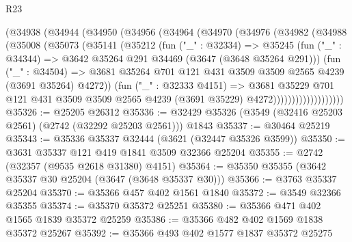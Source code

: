 \begin{lexlean}{R23}
\begin{coremodule}
              (@34938
                (@34944
                  (@34950
                    (@34956
                      (@34964
                        (@34970
                          (@34976
                            (@34982
                              (@34988
                                (@35008
                                  (@35073
                                    (@35141
                                      (@35212
                                        (fun ("_" : @32334) =>
                                        @35245
                                          (fun ("_" : @34344) =>
                                          @3642 @35264 @291 @34469 (@3647 (@3648 @35264 @291)))
                                          (fun ("_" : @34504) =>
                                          @3681
                                            @35264
                                            @701
                                            @121
                                            @431
                                            @3509
                                            @3509
                                            @2565
                                            @4239
                                            (@3691 @35264)
                                            @4272))
                                        (fun ("_" : @32333 @4151) =>
                                        @3681
                                          @35229
                                          @701
                                          @121
                                          @431
                                          @3509
                                          @3509
                                          @2565
                                          @4239
                                          (@3691 @35229)
                                          @4272)))))))))))))))))))
@35326 := @25205 @26312
@35336 := @32429 @35326 (@3549 (@32416 @25203 @2561) (@2742 (@32292 @25203 @2561))) @1843
@35337 := @30464 @25219
@35343 := @35336 @35337 @32444 (@3621 (@32447 @35326 @3599))
@35350 := @3631 @35337 @121 @419 @1841 @3509 @32366 @25204
@35355 := @2742 (@32357 (@9535 @2618 @31380) @4151)
@35364 := @35350 @35355 (@3642 @35337 @30 @25204 (@3647 (@3648 @35337 @30)))
@35366 := @3763 @35337 @25204
@35370 := @35366 @457 @402 @1561 @1840
@35372 := @3549 @32366 @35355
@35374 := @35370 @35372 @25251
@35380 := @35366 @471 @402 @1565 @1839 @35372 @25259
@35386 := @35366 @482 @402 @1569 @1838 @35372 @25267
@35392 := @35366 @493 @402 @1577 @1837 @35372 @25275

\end{coremodule}
\end{lexlean}
